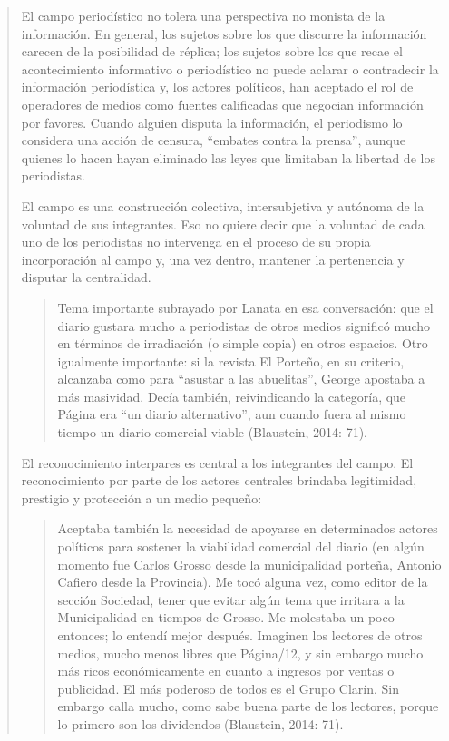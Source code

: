 \begin{quote}
El campo periodístico no tolera una perspectiva no monista de la información. En general, los sujetos sobre los que discurre la información carecen de la posibilidad de réplica; los sujetos sobre los que recae el acontecimiento informativo o periodístico no puede aclarar o contradecir la información periodística y, los actores políticos, han aceptado el rol de operadores de medios como fuentes calificadas que negocian información por favores. Cuando alguien disputa la información, el periodismo lo considera una acción de censura, ``embates contra la prensa'', aunque quienes lo hacen hayan eliminado las leyes que limitaban la libertad de los periodistas.

El campo es una construcción colectiva, intersubjetiva y autónoma de la voluntad de sus integrantes. Eso no quiere decir que la voluntad de cada uno de los periodistas no intervenga en el proceso de su propia incorporación al campo y, una vez dentro, mantener la pertenencia y disputar la centralidad.

\begin{quote}
	Tema importante subrayado por Lanata en esa conversación: que el diario gustara mucho a periodistas de otros medios significó mucho en términos de irradiación (o simple copia) en otros espacios. Otro igualmente importante: si la revista El Porteño, en su criterio, alcanzaba como para \enquote{asustar a las abuelitas}, George apostaba a más masividad. Decía también, reivindicando la categoría, que Página era \enquote{un diario alternativo}, aun cuando fuera al mismo tiempo un diario comercial viable (Blaustein, 2014: 71).
\end{quote}


El reconocimiento interpares es central a los integrantes del campo. El reconocimiento por parte de los actores centrales brindaba legitimidad, prestigio y protección a un medio pequeño:

\begin{quote}
	Aceptaba también la necesidad de apoyarse en determinados actores políticos para sostener la viabilidad comercial del diario (en algún momento fue Carlos Grosso desde la municipalidad porteña, Antonio Cafiero desde la Provincia). Me tocó alguna vez, como editor de la sección Sociedad, tener que evitar algún tema que irritara a la Municipalidad en tiempos de Grosso. Me molestaba un poco entonces; lo entendí mejor después. Imaginen los lectores de otros medios, mucho menos libres que Página/12, y sin embargo mucho más ricos económicamente en cuanto a ingresos por ventas o publicidad. El más poderoso de todos es el Grupo Clarín. Sin embargo calla mucho, como sabe buena parte de los lectores, porque lo primero son los dividendos (Blaustein, 2014: 71).
\end{quote}



\end{quote}
